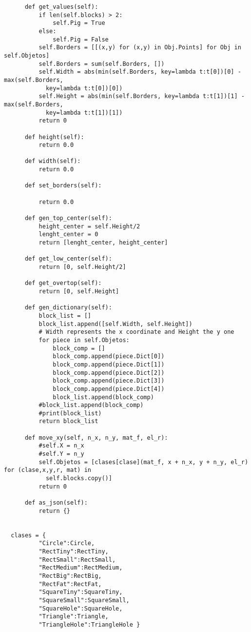\begin{verbatim}
      def get_values(self):
          if len(self.blocks) > 2:
              self.Pig = True
          else:
              self.Pig = False
          self.Borders = [[(x,y) for (x,y) in Obj.Points] for Obj in self.Objetos]
          self.Borders = sum(self.Borders, [])
          self.Width = abs(min(self.Borders, key=lambda t:t[0])[0] - max(self.Borders, 
            key=lambda t:t[0])[0])
          self.Height = abs(min(self.Borders, key=lambda t:t[1])[1] - max(self.Borders, 
            key=lambda t:t[1])[1])
          return 0

      def height(self):
          return 0.0

      def width(self):
          return 0.0
      
      def set_borders(self):
          
          return 0.0

      def gen_top_center(self):
          height_center = self.Height/2
          lenght_center = 0
          return [lenght_center, height_center]
      
      def get_low_center(self):
          return [0, self.Height/2]
      
      def get_overtop(self):
          return [0, self.Height]

      def gen_dictionary(self):
          block_list = []
          block_list.append([self.Width, self.Height]) 
          # Width represents the x coordinate and Height the y one
          for piece in self.Objetos:
              block_comp = []
              block_comp.append(piece.Dict[0])
              block_comp.append(piece.Dict[1])
              block_comp.append(piece.Dict[2])
              block_comp.append(piece.Dict[3])
              block_comp.append(piece.Dict[4])
              block_list.append(block_comp)
          #block_list.append(block_comp)
          #print(block_list)
          return block_list
      
      def move_xy(self, n_x, n_y, mat_f, el_r):
          #self.X = n_x
          #self.Y = n_y
          self.Objetos = [clases[clase](mat_f, x + n_x, y + n_y, el_r) for (clase,x,y,r, mat) in 
            self.blocks.copy()]
          return 0
      
      def as_json(self):
          return {}
    

  clases = {
          "Circle":Circle,
          "RectTiny":RectTiny,
          "RectSmall":RectSmall,
          "RectMedium":RectMedium,
          "RectBig":RectBig,
          "RectFat":RectFat,
          "SquareTiny":SquareTiny,
          "SquareSmall":SquareSmall,
          "SquareHole":SquareHole,
          "Triangle":Triangle,
          "TriangleHole":TriangleHole }


\end{verbatim}
